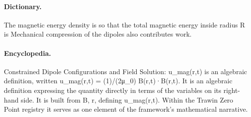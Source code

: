 \paragraph{Dictionary.}
The magnetic energy density is so that the total magnetic energy inside radius R is Mechanical compression of the dipoles also contributes work.

\paragraph{Encyclopedia.}
Constrained Dipole Configurations and Field Solution: u\_mag(r,t) is an algebraic definition, written u\_mag(r,t) = (1)/(2μ\_0) B(r,t)·B(r,t). It is an algebraic definition expressing the quantity directly in terms of the variables on its right-hand side. It is built from B, r, defining u\_mag(r,t). Within the Trawin Zero Point registry it serves as one element of the framework's mathematical narrative.
